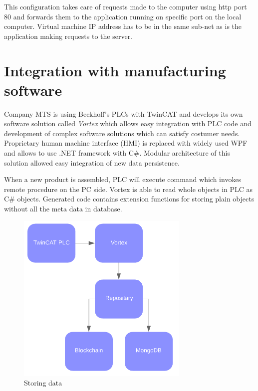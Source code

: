 This configuration takes care of requests made to the computer using http port 80  and forwards them to the application running on specific port on the local computer. Virtual machine IP address has to be in the same sub-net as is the application making requests to the server.

\section{Integration with manufacturing software}

Company MTS is using Beckhoff's PLCs with TwinCAT and develops its own software solution called \emph{Vortex} which allows easy integration with PLC code and development of complex software solutions which can satisfy costumer needs. Proprietary human machine interface (HMI) is replaced with widely used WPF and allows to use .NET framework with C\#. Modular architecture of this solution allowed easy integration of new data persistence. 

When a new product is assembled, PLC will execute command which invokes remote procedure on the PC side. Vortex is able to read whole objects in PLC as C\# objects. Generated code contains extension functions for storing plain objects without all the meta data in database. 

\begin{figure}[H]
    \begin{center}
        \begin{minipage}{\linewidth}
            \begin{center}
                \includegraphics[width=(0.5\textwidth),keepaspectratio]{img/vortex_data.png}
                \caption{Storing data }
                \label{obr 1.2.1}
            \end{center}
        \end{minipage}
    \end{center}
\end{figure}

